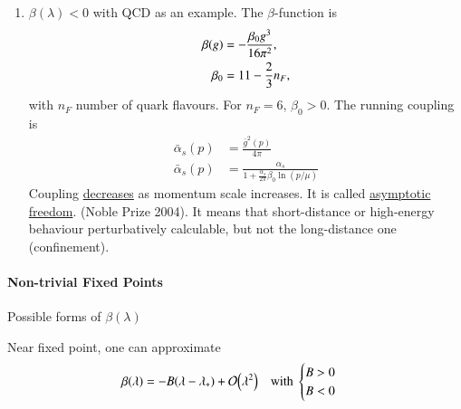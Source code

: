 \begin{enumerate}
\item $\beta(\lambda) < 0 $ with QCD as an example.
The $\beta$-function is
\begin{align}
   \beta(g) &= - \frac{\beta_0 g^3}{16 \pi^2}, \\
   \beta_0 &= 11 - \frac{2}{3} n_F, \notag
\end{align}
with $n_F$ number of quark flavours. For $n_F = 6$, $\beta_0 > 0$.
The running coupling is
\begin{align}
   \bar{\alpha}_s (p) &= \frac{\bar{g}^2 (p)}{4\pi} \\
   \bar{\alpha}_s(p) &= \frac{\alpha_s}{1 + \frac{\alpha_s}{2\pi}\beta_0 \ln (p / \mu)}
\end{align}
Coupling \underline{decreases} as momentum scale increases. It is called \underline{asymptotic freedom}. (Noble Prize 2004). It means that short-distance or high-energy behaviour perturbatively calculable, but not the long-distance one (confinement).
\end{enumerate}

\paragraph{Non-trivial Fixed Points}
Possible forms of $\beta(\lambda)$
\begin{center}
\end{center}


Near fixed point, one can approximate 
\begin{align}
   \beta(\lambda) = - B (\lambda - \lambda_*) + \order{\lambda^2}
   \quad
  \text{with }
  \begin{cases}
     B > 0 \\
     B < 0
  \end{cases}
\end{align}

